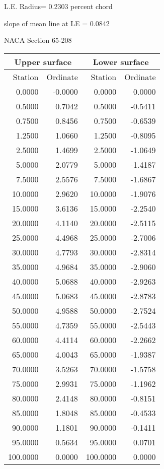 \documentclass[11pt]{book}
\begin{document}
L.E. Radius=  0.2303 percent chord


 slope of mean line at LE =  0.0842
 \newpage
  \label{s65-208}
 \begin{Large}
 NACA Section 65-208
 \end{Large}
  
 \vspace{8mm}
 \begin{tabular}{|r|r|r|r|} \hline 
 \multicolumn{2}{|c|}{Upper surface} & \multicolumn{2}{|c|}{Lower surface} \\
 \hline
 Station & Ordinate & Station & Ordinate \\
 \hline
0.0000 & -0.0000 & 0.0000 & 0.0000 \\
0.5000 & 0.7042 & 0.5000 & -0.5411 \\
0.7500 & 0.8456 & 0.7500 & -0.6539 \\
1.2500 & 1.0660 & 1.2500 & -0.8095 \\
2.5000 & 1.4699 & 2.5000 & -1.0649 \\
5.0000 & 2.0779 & 5.0000 & -1.4187 \\
7.5000 & 2.5576 & 7.5000 & -1.6867 \\
10.0000 & 2.9620 & 10.0000 & -1.9076 \\
15.0000 & 3.6136 & 15.0000 & -2.2540 \\
20.0000 & 4.1140 & 20.0000 & -2.5115 \\
25.0000 & 4.4968 & 25.0000 & -2.7006 \\
30.0000 & 4.7793 & 30.0000 & -2.8314 \\
35.0000 & 4.9684 & 35.0000 & -2.9060 \\
40.0000 & 5.0688 & 40.0000 & -2.9263 \\
45.0000 & 5.0683 & 45.0000 & -2.8783 \\
50.0000 & 4.9588 & 50.0000 & -2.7524 \\
55.0000 & 4.7359 & 55.0000 & -2.5443 \\
60.0000 & 4.4114 & 60.0000 & -2.2662 \\
65.0000 & 4.0043 & 65.0000 & -1.9387 \\
70.0000 & 3.5263 & 70.0000 & -1.5758 \\
75.0000 & 2.9931 & 75.0000 & -1.1962 \\
80.0000 & 2.4148 & 80.0000 & -0.8151 \\
85.0000 & 1.8048 & 85.0000 & -0.4533 \\
90.0000 & 1.1801 & 90.0000 & -0.1411 \\
95.0000 & 0.5634 & 95.0000 & 0.0701 \\
100.0000 & 0.0000 & 100.0000 & 0.0000 \\
 \hline 
 \end{tabular}
\end{document}
